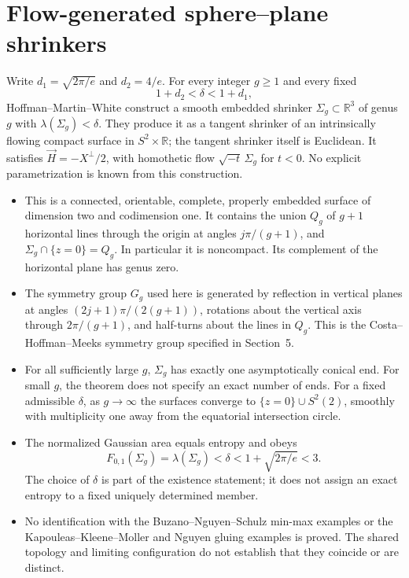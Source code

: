 \begin{example}
\end{example}

\chapter{Flow-generated sphere--plane shrinkers}\label{sec:catalogue-hmw-one-ended}
\begin{example}\label{ex:catalogue-hmw-one-ended}
Write $d_1=\sqrt{2\pi/e}$ and $d_2=4/e$. For every integer $g\geq1$ and every fixed
\[
 1+d_2<\delta<1+d_1,
\]
Hoffman--Martin--White construct a smooth embedded shrinker $\Sigma_g\subset\mathbb R^3$ of genus $g$ with $\lambda(\Sigma_g)<\delta$. They produce it as a tangent shrinker of an intrinsically flowing compact surface in $S^2\times\mathbb R$; the tangent shrinker itself is Euclidean. It satisfies $\vec H=-X^\perp/2$, with homothetic flow $\sqrt{-t}\,\Sigma_g$ for $t<0$. No explicit parametrization is known from this construction.
\begin{itemize}
\item This is a connected, orientable, complete, properly embedded surface of dimension two and codimension one. It contains the union $Q_g$ of $g+1$ horizontal lines through the origin at angles $j\pi/(g+1)$, and $\Sigma_g\cap\{z=0\}=Q_g$. In particular it is noncompact. Its complement of the horizontal plane has genus zero.
\item The symmetry group $G_g$ used here is generated by reflection in vertical planes at angles $(2j+1)\pi/(2(g+1))$, rotations about the vertical axis through $2\pi/(g+1)$, and half-turns about the lines in $Q_g$. This is the Costa--Hoffman--Meeks symmetry group specified in Section~5.
\item For all sufficiently large $g$, $\Sigma_g$ has exactly one asymptotically conical end. For small $g$, the theorem does not specify an exact number of ends. For a fixed admissible $\delta$, as $g\to\infty$ the surfaces converge to $\{z=0\}\cup S^2(2)$, smoothly with multiplicity one away from the equatorial intersection circle.
\item The normalized Gaussian area equals entropy and obeys
\[
 F_{0,1}(\Sigma_g)=\lambda(\Sigma_g)<\delta<1+\sqrt{2\pi/e}<3.
\]
The choice of $\delta$ is part of the existence statement; it does not assign an exact entropy to a fixed uniquely determined member.
\item No identification with the Buzano--Nguyen--Schulz min-max examples or the Kapouleas--Kleene--Moller and Nguyen gluing examples is proved. The shared topology and limiting configuration do not establish that they coincide or are distinct.

\end{itemize}
\end{example}
